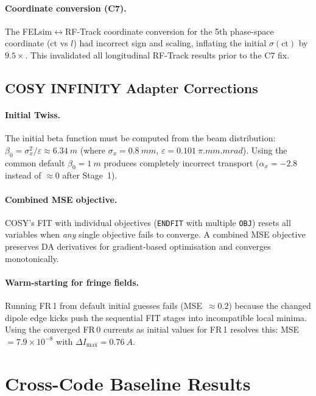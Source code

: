 \documentclass[11pt]{article}
\begin{document}
\paragraph{Coordinate conversion (C7).}
The FELsim$\leftrightarrow$RF-Track coordinate conversion for the 5th
phase-space coordinate (ct vs $l$) had incorrect sign and scaling,
inflating the initial $\sigma(\text{ct})$ by $9.5\times$.  This
invalidated all longitudinal RF-Track results prior to the C7 fix.


\subsection{COSY INFINITY Adapter Corrections}

\paragraph{Initial Twiss.}
The initial beta function must be computed from the beam distribution:
$\beta_0 = \sigma_x^2/\varepsilon \approx \SI{6.34}{m}$ (where
$\sigma_x = \SI{0.8}{mm}$, $\varepsilon = \SI{0.101}{\pi.mm.mrad}$).
Using the common default $\beta_0 = \SI{1}{m}$ produces completely
incorrect transport ($\alpha_x = -2.8$ instead of $\approx 0$ after
Stage~1).

\paragraph{Combined MSE objective.}
COSY's FIT with individual objectives (\texttt{ENDFIT} with multiple
\texttt{OBJ}) resets all variables when \emph{any} single objective
fails to converge.  A combined MSE objective preserves DA derivatives
for gradient-based optimisation and converges monotonically.

\paragraph{Warm-starting for fringe fields.}
Running FR\,1 from default initial guesses fails
(MSE~$\approx 0.2$) because the changed dipole edge kicks push the
sequential FIT stages into incompatible local minima.  Using the
converged FR\,0 currents as initial values for FR\,1 resolves this:
MSE~$= 7.9 \times 10^{-8}$ with $\Delta I_\text{max} = \SI{0.76}{A}$.


\section{Cross-Code Baseline Results}
\end{document}
